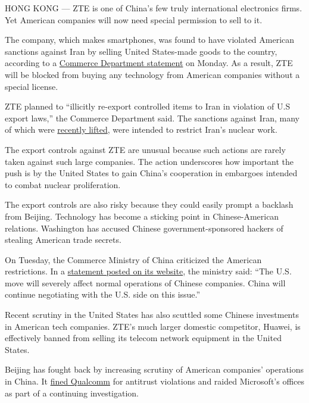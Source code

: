 HONG KONG --- ZTE is one of China's few truly international electronics
firms. Yet American companies will now need special permission to sell
to it.

The company, which makes smartphones, was found to have violated
American sanctions against Iran by selling United States-made goods to
the country, according to a
\href{https://s3.amazonaws.com/public-inspection.federalregister.gov/2016-05104.pdf}{Commerce
Department statement} on Monday. As a result, ZTE will be blocked from
buying any technology from American companies without a special license.

ZTE planned to ``illicitly re-export controlled items to Iran in
violation of U.S export laws,'' the Commerce Department said. The
sanctions against Iran, many of which were
\href{http://www.nytimes.com/2016/03/08/world/middleeast/embargo-lifted-iranian-oil-reaches-europe.html}{recently
lifted}, were intended to restrict Iran's nuclear work.

The export controls against ZTE are unusual because such actions are
rarely taken against such large companies. The action underscores how
important the push is by the United States to gain China's cooperation
in embargoes intended to combat nuclear proliferation.

The export controls are also risky because they could easily prompt a
backlash from Beijing. Technology has become a sticking point in
Chinese-American relations. Washington has accused Chinese
government-sponsored hackers of stealing American trade secrets.

On Tuesday, the Commerce Ministry of China criticized the American
restrictions. In a
\href{http://www.mofcom.gov.cn/article/ae/ag/201603/20160301270246.shtml}{statement
posted on its website}, the ministry said: ``The U.S. move will severely
affect normal operations of Chinese companies. China will continue
negotiating with the U.S. side on this issue.''

Recent scrutiny in the United States has also scuttled some Chinese
investments in American tech companies. ZTE's much larger domestic
competitor, Huawei, is effectively banned from selling its telecom
network equipment in the United States.

Beijing has fought back by increasing scrutiny of American companies'
operations in China. It
\href{http://www.nytimes.com/2015/02/10/business/international/qualcomm-fine-china-antitrust-investigation.html}{fined
Qualcomm} for antitrust violations and raided Microsoft's offices as
part of a continuing investigation.

